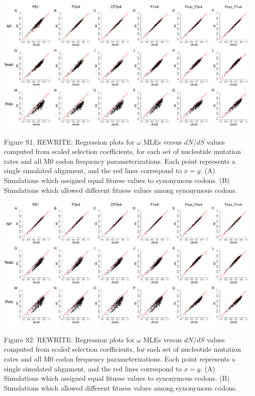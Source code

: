 \documentclass{pnastwo}
\begin{document}
\newpage

\begin{landscape}
\includegraphics[width=9in]{figures/SI/nyp_datafreqs.pdf}
\vspace{0.5cm}

\noindent Figure S1. REWRITE: Regression plots for $\omega$ MLEs versus $dN/dS$ values computed from scaled selection coefficients, for each set of nucleotide mutation rates and all M0 codon frequency parameterizations. Each point represents a single simulated alignment, and the red lines correspond to $x=y$. (A) Simulations which assigned equal fitness values to synonymous codons. (B) Simulations which allowed different fitness values among synonymous codons.
\end{landscape}

\begin{landscape}
\includegraphics[width=9in]{figures/SI/nyp_truefreqs.pdf}
\vspace{0.5cm}

\noindent Figure S2. REWRITE: Regression plots for $\omega$ MLEs versus $dN/dS$ values computed from scaled selection coefficients, for each set of nucleotide mutation rates and all M0 codon frequency parameterizations. Each point represents a single simulated alignment, and the red lines correspond to $x=y$. (A) Simulations which assigned equal fitness values to synonymous codons. (B) Simulations which allowed different fitness values among synonymous codons.
\end{landscape}
	
\end{document}
